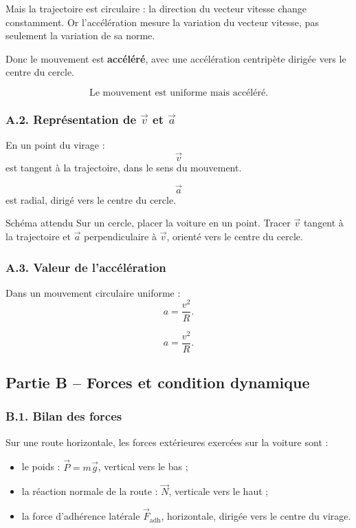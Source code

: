 \documentclass[11pt,a4paper]{article}
\begin{document}
Mais la trajectoire est circulaire : la direction du vecteur vitesse change constamment. Or l'accélération mesure la variation du vecteur vitesse, pas seulement la variation de sa norme.

Donc le mouvement est \textbf{accéléré}, avec une accélération centripète dirigée vers le centre du cercle.

\begin{resultatbox}
\[
\boxed{\text{Le mouvement est uniforme mais accéléré.}}
\]
\end{resultatbox}

\subsubsection*{A.2. Représentation de $\vec v$ et $\vec a$}

En un point du virage :
\[
\vec v
\]
est tangent à la trajectoire, dans le sens du mouvement.

\[
\vec a
\]
est radial, dirigé vers le centre du cercle.

\begin{methodebox}{Schéma attendu}
Sur un cercle, placer la voiture en un point. Tracer $\vec v$ tangent à la trajectoire et $\vec a$ perpendiculaire à $\vec v$, orienté vers le centre du cercle.
\end{methodebox}

\subsubsection*{A.3. Valeur de l'accélération}

Dans un mouvement circulaire uniforme :
\[
a=\frac{v^2}{R}.
\]

\begin{resultatbox}
\[
\boxed{a=\frac{v^2}{R}.}
\]
\end{resultatbox}

\subsection{Partie B -- Forces et condition dynamique}

\subsubsection*{B.1. Bilan des forces}

Sur une route horizontale, les forces extérieures exercées sur la voiture sont :
\begin{itemize}
  \item le poids : $\vec P=m\vec g$, vertical vers le bas ;
  \item la réaction normale de la route : $\vec N$, verticale vers le haut ;
  \item la force d'adhérence latérale $\vec F_{\text{adh}}$, horizontale, dirigée vers le centre du virage.
\end{itemize}
\end{document}
